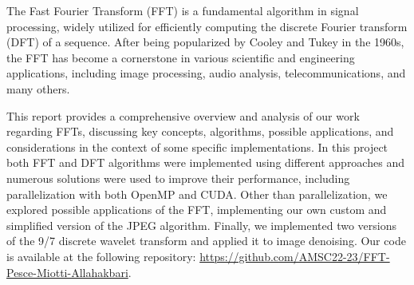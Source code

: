The Fast Fourier Transform (FFT) is a fundamental algorithm in signal processing, widely utilized for efficiently computing the discrete Fourier transform (DFT) of a sequence. After being popularized by Cooley and Tukey in the 1960s, the FFT has become a cornerstone in various scientific and engineering applications, including image processing, audio analysis, telecommunications, and many others. 

This report provides a comprehensive overview and analysis of our work regarding FFTs, discussing key concepts, algorithms, possible applications, and considerations in the context of some specific implementations. In this project both FFT and DFT algorithms were implemented using different approaches and numerous solutions were used to improve their performance, including parallelization with both OpenMP and CUDA. Other than parallelization, we explored possible applications of the FFT, implementing our own custom and simplified version of the JPEG algorithm. Finally, we implemented two versions of the 9/7 discrete wavelet transform and applied it to image denoising. Our code is available at the following repository: \url{https://github.com/AMSC22-23/FFT-Pesce-Miotti-Allahakbari}.